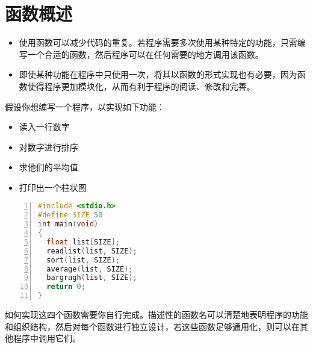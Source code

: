 \section{函数概述}

\begin{frame}
\begin{itemize}
\item 使用函数可以减少代码的重复。若程序需要多次使用某种特定的功能，只需编写一个合适的函数，然后程序可以在任何需要的地方调用该函数。\\[0.2in]
\item 即使某种功能在程序中只使用一次，将其以函数的形式实现也有必要，因为函数使得程序更加模块化，从而有利于程序的阅读、修改和完善。
\end{itemize}
\end{frame}

\begin{frame}
假设你想编写一个程序，以实现如下功能：\vspace{0.1in}

\begin{itemize}
\item  读入一行数字 \\[0.1in]
\item  对数字进行排序 \\[0.1in]
\item  求他们的平均值 \\[0.1in]
\item  打印出一个柱状图
\end{itemize}
\end{frame}

\begin{frame}[fragile]
\begin{lstlisting}[language=c,numbers=left,frame=single]
#include <stdio.h>
#define SIZE 50
int main(void)
{
  float list[SIZE];  
  readlist(list, SIZE);
  sort(list, SIZE);
  average(list, SIZE);
  bargragh(list, SIZE);  
  return 0;
}
\end{lstlisting}
\end{frame}

\begin{frame}[fragile]
如何实现这四个函数需要你自行完成。描述性的函数名可以清楚地表明程序的功能和组织结构，然后对每个函数进行独立设计，若这些函数足够通用化，则可以在其他程序中调用它们。
\end{frame}


